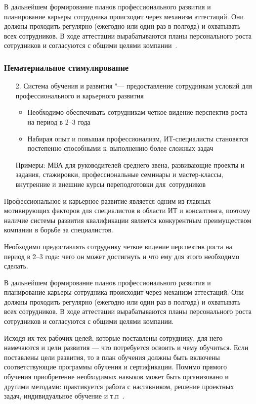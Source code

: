 \documentclass{../industrial-development}
\begin{document}
В дальнейшем формирование планов профессионального развития и планирование карьеры сотрудника происходит через механизм аттестаций. Они должны проходить регулярно (ежегодно или один раз в полгода) и охватывать всех сотрудников. В ходе аттестации вырабатываются планы персонального роста сотрудников и согласуются с общими целями компании~\cite{TriKitMotiv}.

\begin{frame} \frametitle{Нематериальное стимулирование}
	\begin{itemize}					
		\item[2.] \alert{Система обучения и развития} "--- предоставление сотрудникам условий для профессионального и карьерного развития
		\begin{itemize}
			\item Необходимо обеспечивать сотрудникам четкое видение перспектив роста на период в 2--3 года
			\item Набирая опыт и повышая профессионализм, ИТ-специалисты
			становятся постепенно способными к~выполнению более сложных задач
		\end{itemize}
		Примеры: МВА для руководителей среднего звена, развивающие проекты и задания, стажировки, профессиональные семинары и мастер-классы, внутренние и внешние курсы переподготовки для~сотрудников
	\end{itemize}
\end{frame}

\lecturenotes

Профессиональное и карьерное развитие является одним из главных мотивирующих факторов для специалистов в области ИТ и консалтинга, поэтому наличие системы развития квалификации является конкурентным преимуществом компании в борьбе за специалистов.

Необходимо предоставлять сотруднику четкое видение перспектив роста на период в 2--3 года: чего он может достигнуть и что ему для этого необходимо сделать.

В дальнейшем формирование планов профессионального развития и планирование карьеры сотрудника происходит через механизм аттестаций. Они должны проходить регулярно (ежегодно или один раз в полгода) и охватывать всех сотрудников. В ходе аттестации вырабатываются планы персонального роста сотрудников и согласуются с общими целями компании.

Исходя их тех рабочих целей, которые поставлены сотруднику, для него намечаются и цели развития — что потребуется освоить и чему обучиться. Если поставлены цели развития, то в план обучения должны быть включены соответствующие программы обучения и сертификации. Помимо прямого обучения приобретение необходимых навыков может быть организовано и другими методами: практикуется работа с наставником, решение проектных задач, индивидуальное обучение и т.п~\cite{TriKitMotiv}.
\end{document}
